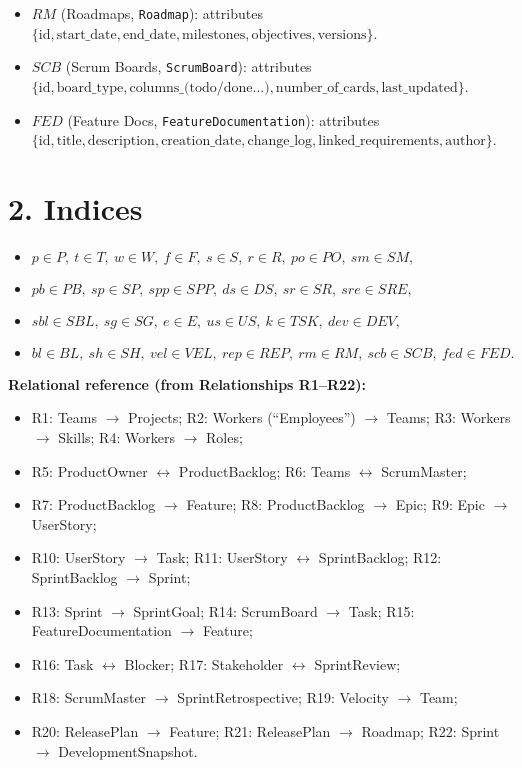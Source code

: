 \documentclass[11pt,a4paper]{article}
\begin{document}
\begin{itemize}
  \item $RM$ (Roadmaps, \texttt{Roadmap}): attributes $\{\text{id},\text{start\_date},\text{end\_date},\text{milestones},\text{objectives},\text{versions}\}$.
  \item $SCB$ (Scrum Boards, \texttt{ScrumBoard}): attributes $\{\text{id},\text{board\_type},\text{columns\_(todo/done...)},\text{number\_of\_cards},\text{last\_updated}\}$.
  \item $FED$ (Feature Docs, \texttt{FeatureDocumentation}): attributes $\{\text{id},\text{title},\text{description},\text{creation\_date},\text{change\_log},\text{linked\_requirements},\text{author}\}$.
\end{itemize}

\section{2. Indices}
\begin{itemize}
  \item $p \in P,\ t \in T,\ w \in W,\ f \in F,\ s \in S,\ r \in R,\ po \in PO,\ sm \in SM,$
  \item $pb \in PB,\ sp \in SP,\ spp \in SPP,\ ds \in DS,\ sr \in SR,\ sre \in SRE,$
  \item $sbl \in SBL,\ sg \in SG,\ e \in E,\ us \in US,\ k \in TSK,\ dev \in DEV,$
  \item $bl \in BL,\ sh \in SH,\ vel \in VEL,\ rep \in REP,\ rm \in RM,\ scb \in SCB,\ fed \in FED.$
\end{itemize}

\noindent \textbf{Relational reference (from Relationships R1--R22):}
\begin{itemize}[leftmargin=2em]
  \item R1: Teams $\to$ Projects; R2: Workers (``Employees'') $\to$ Teams; R3: Workers $\to$ Skills; R4: Workers $\to$ Roles;
  \item R5: ProductOwner $\leftrightarrow$ ProductBacklog; R6: Teams $\leftrightarrow$ ScrumMaster;
  \item R7: ProductBacklog $\to$ Feature; R8: ProductBacklog $\to$ Epic; R9: Epic $\to$ UserStory;
  \item R10: UserStory $\to$ Task; R11: UserStory $\leftrightarrow$ SprintBacklog; R12: SprintBacklog $\to$ Sprint;
  \item R13: Sprint $\to$ SprintGoal; R14: ScrumBoard $\to$ Task; R15: FeatureDocumentation $\to$ Feature;
  \item R16: Task $\leftrightarrow$ Blocker; R17: Stakeholder $\leftrightarrow$ SprintReview;
  \item R18: ScrumMaster $\to$ SprintRetrospective; R19: Velocity $\to$ Team;
  \item R20: ReleasePlan $\to$ Feature; R21: ReleasePlan $\to$ Roadmap; R22: Sprint $\to$ DevelopmentSnapshot.
\end{itemize}
\end{document}

